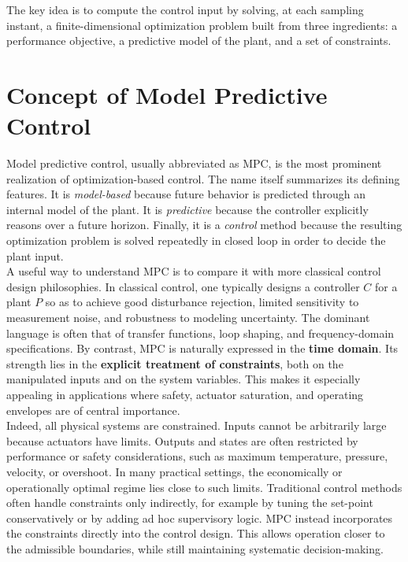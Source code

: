 \begin{theorembox}
The key idea is to compute the control input by solving, at each sampling instant, a finite-dimensional optimization problem built from three ingredients: a performance objective, a predictive model of the plant, and a set of constraints.
\end{theorembox}

\section{Concept of Model Predictive Control}

Model predictive control, usually abbreviated as MPC, is the most prominent realization of optimization-based control. The name itself summarizes its defining features. It is \emph{model-based} because future behavior is predicted through an internal model of the plant. It is \emph{predictive} because the controller explicitly reasons over a future horizon. Finally, it is a \emph{control} method because the resulting optimization problem is solved repeatedly in closed loop in order to decide the plant input.\\

A useful way to understand MPC is to compare it with more classical control design philosophies. In classical control, one typically designs a controller $C$ for a plant $P$ so as to achieve good disturbance rejection, limited sensitivity to measurement noise, and robustness to modeling uncertainty. The dominant language is often that of transfer functions, loop shaping, and frequency-domain specifications. By contrast, MPC is naturally expressed in the \textbf{time domain}. Its strength lies in the \textbf{explicit treatment of constraints}, both on the manipulated inputs and on the system variables. This makes it especially appealing in applications where safety, actuator saturation, and operating envelopes are of central importance.\\
Indeed, all physical systems are constrained. Inputs cannot be arbitrarily large because actuators have limits. Outputs and states are often restricted by performance or safety considerations, such as maximum temperature, pressure, velocity, or overshoot. In many practical settings, the economically or operationally optimal regime lies close to such limits. Traditional control methods often handle constraints only indirectly, for example by tuning the set-point conservatively or by adding ad hoc supervisory logic. MPC instead incorporates the constraints directly into the control design. This allows operation closer to the admissible boundaries, while still maintaining systematic decision-making.\\

